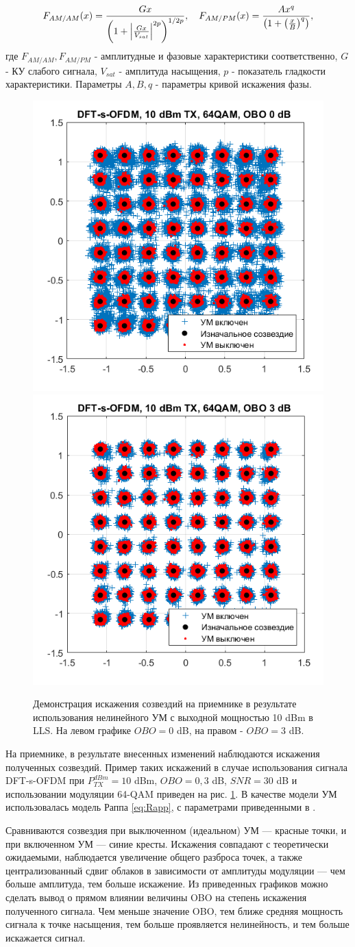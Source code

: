\documentclass{unn}
\begin{document}
\begin{equation}
    F_{AM/AM}(x) = \frac{G x}{\left( 1 + \abs{\frac{Gx}{V_{sat}}}^{2p}\right)^{1/2p}},
    \quad 
    F_{AM/PM}(x) = \frac{Ax^q}{\left(1+\left(\frac{x}{B}\right)^q\right)},
    \label{eq:Rapp}
\end{equation}
где $F_{AM/AM}, F_{AM/PM}$ - амплитудные и фазовые характеристики
соответственно, $G$ - КУ слабого сигнала, $V_{sat}$ - амплитуда насыщения,
$p$ - показатель гладкости характеристики. Параметры $A,B,q$ - параметры
кривой искажения фазы.

\begin{figure}[h!]
  \centering
  \includegraphics[width=0.35\linewidth]{figs/dfts_10dbm_obo0.png}
  \includegraphics[width=0.35\linewidth]{figs/dfts_10dbm_obo3.png}
  \caption{Демонстрация искажения созвездий на приемнике в результате
  использования нелинейного УМ с выходной мощностью 10 dBm в LLS. На левом
  графике $OBO=0$ dB, на правом - $OBO=3$ dB.}
  \label{fig:lls_rapp_distortions_10dbm}
\end{figure}

На приемнике, в результате внесенных изменений наблюдаются искажения
полученных созвездий. Пример таких искажений в случае
использования сигнала DFT-s-OFDM при $P^{dBm}_{TX} = 10$ dBm, $OBO = 0,3$
dB, $SNR=30$ dB и использовании модуляции 64-QAM приведен на рис.
\ref{fig:lls_rapp_distortions_10dbm}. В качестве модели УМ использовалась
модель Раппа \ref{eq:Rapp}, с параметрами приведенными в \cite{nokia163314}.


Сравниваются созвездия при выключенном (идеальном) УМ — красные точки, и
при включенном УМ — синие кресты.
Искажения совпадают с теоретически ожидаемыми, наблюдается увеличение
общего разброса точек, а также централизованный сдвиг облаков в зависимости
от амплитуды модуляции — чем больше амплитуда, тем больше искажение.
Из приведенных графиков можно сделать вывод о прямом влиянии величины OBO
на степень искажения полученного сигнала. Чем меньше значение OBO, тем
ближе средняя мощность сигнала к точке насыщения, тем больше проявляется
нелинейность, и тем больше искажается сигнал.
\end{document}
